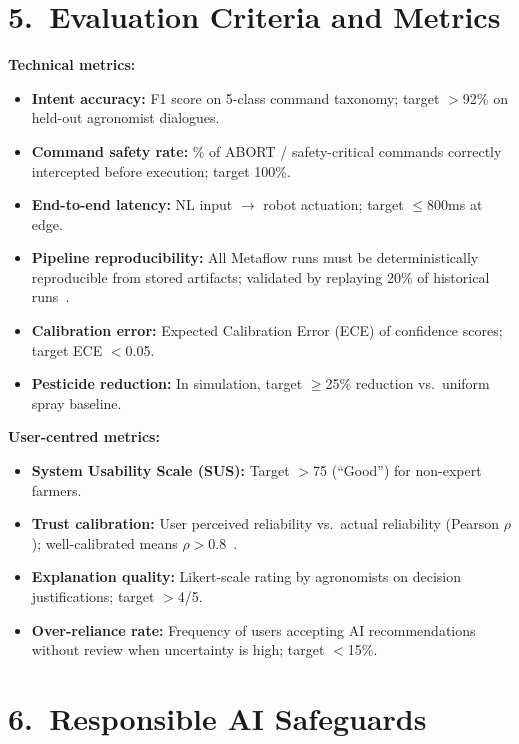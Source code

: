 \documentclass[11pt,a4paper]{article}
\begin{document}
\section{5.\ Evaluation Criteria and Metrics}

\textbf{Technical metrics:}
\begin{itemize}[leftmargin=1.2em,itemsep=1pt]
  \item \textbf{Intent accuracy:} F1 score on 5-class command taxonomy; target $>$92\% on held-out agronomist dialogues.
  \item \textbf{Command safety rate:} \% of ABORT / safety-critical commands correctly intercepted before execution; target 100\%.
  \item \textbf{End-to-end latency:} NL input $\to$ robot actuation; target $\leq$800ms at edge.
  \item \textbf{Pipeline reproducibility:} All Metaflow runs must be deterministically reproducible
  from stored artifacts; validated by replaying 20\% of historical runs~\cite{tagliabue_metaflow_2023}.
  \item \textbf{Calibration error:} Expected Calibration Error (ECE) of confidence scores; target ECE $<$0.05.
  \item \textbf{Pesticide reduction:} In simulation, target $\geq$25\% reduction vs.\ uniform spray baseline.
\end{itemize}

\textbf{User-centred metrics:}
\begin{itemize}[leftmargin=1.2em,itemsep=1pt]
  \item \textbf{System Usability Scale (SUS):} Target $>$75 (``Good'') for non-expert farmers.
  \item \textbf{Trust calibration:} User perceived reliability vs.\ actual reliability (Pearson $\rho$); well-calibrated means $\rho > 0.8$~\cite{kaur_2020}.
  \item \textbf{Explanation quality:} Likert-scale rating by agronomists on decision justifications; target $>$4/5.
  \item \textbf{Over-reliance rate:} Frequency of users accepting AI recommendations without review when uncertainty is high; target $<$15\%.
\end{itemize}

\section{6.\ Responsible AI Safeguards}
\end{document}
